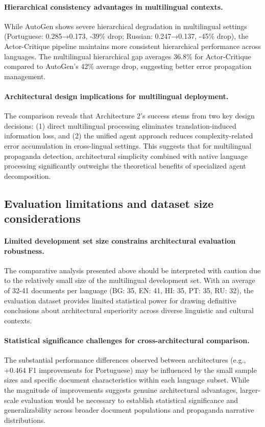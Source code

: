 \paragraph{Hierarchical consistency advantages in multilingual contexts.} While AutoGen shows severe hierarchical degradation in multilingual settings (Portuguese: 0.285→0.173, -39\% drop; Russian: 0.247→0.137, -45\% drop), the Actor-Critique pipeline maintains more consistent hierarchical performance across languages. The multilingual hierarchical gap averages 36.8\% for Actor-Critique compared to AutoGen's 42\% average drop, suggesting better error propagation management.

\paragraph{Architectural design implications for multilingual deployment.} The comparison reveals that Architecture 2's success stems from two key design decisions: (1) direct multilingual processing eliminates translation-induced information loss, and (2) the unified agent approach reduces complexity-related error accumulation in cross-lingual settings. This suggests that for multilingual propaganda detection, architectural simplicity combined with native language processing significantly outweighs the theoretical benefits of specialized agent decomposition.

\subsection{Evaluation limitations and dataset size considerations}

\paragraph{Limited development set size constrains architectural evaluation robustness.} The comparative analysis presented above should be interpreted with caution due to the relatively small size of the multilingual development set. With an average of 32-41 documents per language (BG: 35, EN: 41, HI: 35, PT: 35, RU: 32), the evaluation dataset provides limited statistical power for drawing definitive conclusions about architectural superiority across diverse linguistic and cultural contexts.

\paragraph{Statistical significance challenges for cross-architectural comparison.} The substantial performance differences observed between architectures (e.g., +0.464 F1 improvements for Portuguese) may be influenced by the small sample sizes and specific document characteristics within each language subset. While the magnitude of improvements suggests genuine architectural advantages, larger-scale evaluation would be necessary to establish statistical significance and generalizability across broader document populations and propaganda narrative distributions.

